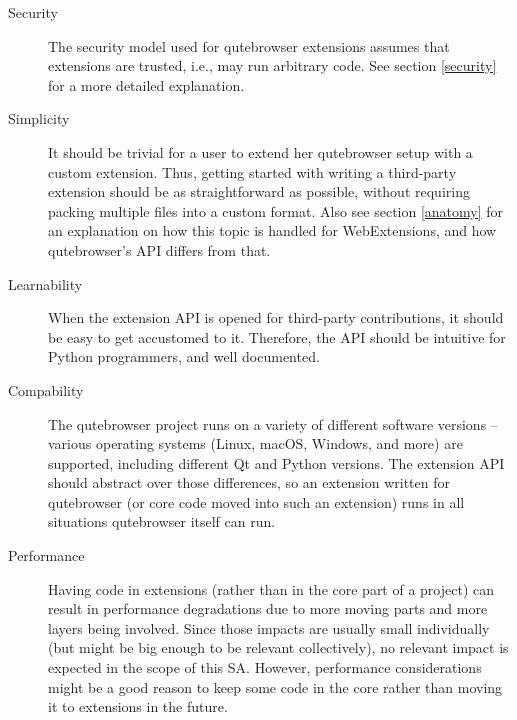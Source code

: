 \documentclass[a4paper,parskip=full,DIV=14,BCOR=15mm]{scrreprt}
\newcommand{\fixme}[1]{\textbf{FIXME} \emph{#1}}
\begin{document}
\begin{description}
  \item[Security] The security model used for qutebrowser extensions assumes
    that extensions are trusted, i.e., may run arbitrary code. See
    section \ref{security} for a more detailed explanation.
  \item[Simplicity] It should be trivial for a user to extend her qutebrowser
    setup with a custom extension. Thus, getting started with writing a
    third-party extension should be as straightforward as possible, without
    requiring packing multiple files into a custom format. Also see section
    \ref{anatomy} for an explanation on how this topic is handled for
    WebExtensions, and how qutebrowser's API differs from that.
  \item[Learnability] When the extension API is opened for third-party
    contributions, it should be easy to get accustomed to it. Therefore, the API
    should be intuitive for Python programmers, and well documented.
  \item[Compability] The qutebrowser project runs on a variety of different
    software versions -- various operating systems (Linux, macOS, Windows,
    and more) are supported, including different Qt and Python versions. The
    extension API should abstract over those differences, so an extension
    written for qutebrowser (or core code moved into such an extension) runs in
    all situations qutebrowser itself can run.
  \item[Performance] Having code in extensions (rather than in the core part of a
    project) can result in performance degradations due to more moving parts and
    more layers being involved. Since those impacts are usually small
    individually (but might be big enough to be relevant collectively), no
    relevant impact is expected in the scope of this SA. However, performance
    considerations might be a good reason to keep some code in the core rather
    than moving it to extensions in the future.
\end{description}

% 
% 
% 
\end{document}
